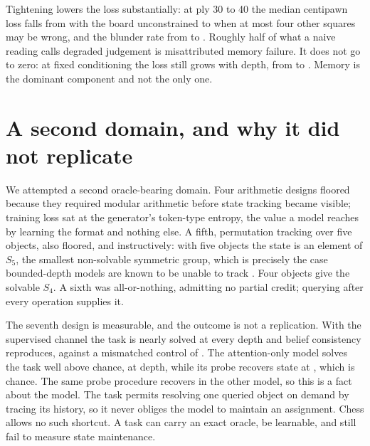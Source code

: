 \documentclass[10pt]{article}
\begin{document}


Tightening lowers the loss substantially: at ply 30 to 40 the median centipawn
loss falls from  with the board unconstrained to
 when at most four other squares may be wrong, and the
blunder rate from  to . Roughly
half of what a naive reading calls degraded judgement is misattributed memory
failure. It does not go to zero: at fixed conditioning the loss still grows with
depth, from  to . Memory is the
dominant component and not the only one.

\section{A second domain, and why it did not replicate}
\label{app:boxes}

We attempted a second oracle-bearing domain. Four arithmetic designs floored
because they required modular arithmetic before state tracking became visible;
training loss sat at the generator's token-type entropy, the value a model
reaches by learning the format and nothing else. A fifth, permutation tracking
over five objects, also floored, and instructively: with five objects the state
is an element of $S_5$, the smallest non-solvable symmetric group, which is
precisely the case bounded-depth models are known to be unable to track
\citep{merrill2024illusion}. Four objects give the solvable $S_4$. A sixth was
all-or-nothing, admitting no partial credit; querying after every operation
supplies it.



The seventh design is measurable, and the outcome is not a replication. With the
supervised channel the task is nearly solved at every depth and belief
consistency reproduces,  against a mismatched control of
. The attention-only model solves the task well above
chance,  at depth, while its probe recovers state at
, which is chance. The same probe procedure recovers
 in the other model, so this is a fact about the model.
The task permits resolving one queried object on demand by tracing its history,
so it never obliges the model to maintain an assignment. Chess allows no such
shortcut. A task can carry an exact oracle, be learnable, and still fail to
measure state maintenance.



\end{document}
